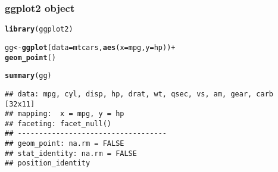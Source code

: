 \documentclass[12pt]{beamer}\usepackage[]{graphicx}\usepackage[]{color}
\makeatletter
\newcommand{\hlopt}[1]{\textcolor[rgb]{0,0,0}{#1}}%
\newcommand{\hlstd}[1]{\textcolor[rgb]{0.345,0.345,0.345}{#1}}%
\newcommand{\hlkwb}[1]{\textcolor[rgb]{0.69,0.353,0.396}{#1}}%
\newcommand{\hlkwc}[1]{\textcolor[rgb]{0.333,0.667,0.333}{#1}}%
\newcommand{\hlkwd}[1]{\textcolor[rgb]{0.737,0.353,0.396}{\textbf{#1}}}%
\newenvironment{kframe}{%
 \def\at@end@of@kframe{}%
 \ifinner\ifhmode%
  \def\at@end@of@kframe{\end{minipage}}%
  \begin{minipage}{\columnwidth}%
 \fi\fi%
 \def\FrameCommand##1{\hskip\@totalleftmargin \hskip-\fboxsep
 \colorbox{shadecolor}{##1}\hskip-\fboxsep
     \hskip-\linewidth \hskip-\@totalleftmargin \hskip\columnwidth}%
 \MakeFramed {\advance\hsize-\width
   \@totalleftmargin\z@ \linewidth\hsize
   \@setminipage}}%
 {\par\unskip\endMakeFramed%
 \at@end@of@kframe}
\newenvironment{knitrout}{}{} %
\makeatother
\begin{document}

\begin{frame}[fragile]
\frametitle{ggplot2 object}

\begin{knitrout}\scriptsize
{}\color{fgcolor}\begin{kframe}
\begin{alltt}
\hlkwd{library}\hlstd{(ggplot2)}

\hlstd{gg} \hlkwb{<-} \hlkwd{ggplot}\hlstd{(}\hlkwc{data} \hlstd{= mtcars,} \hlkwd{aes}\hlstd{(}\hlkwc{x} \hlstd{= mpg,} \hlkwc{y} \hlstd{= hp))} \hlopt{+}
  \hlkwd{geom_point}\hlstd{()}

\hlkwd{summary}\hlstd{(gg)}
\end{alltt}
\begin{verbatim}
## data: mpg, cyl, disp, hp, drat, wt, qsec, vs, am, gear, carb [32x11]
## mapping:  x = mpg, y = hp
## faceting: facet_null() 
## -----------------------------------
## geom_point: na.rm = FALSE
## stat_identity: na.rm = FALSE
## position_identity
\end{verbatim}
\end{kframe}
\end{knitrout}

\end{frame}

\end{document}

